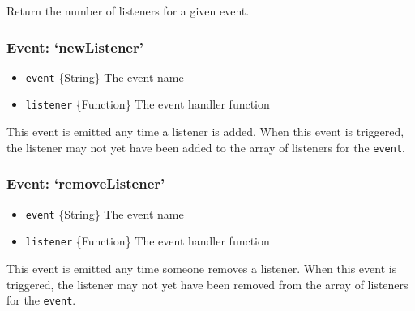 Return the number of listeners for a given event.

\subsubsection{\texorpdfstring{Event:
`newListener'}{Event: newListener}}\label{event-newlistener}

\begin{itemize}
\itemsep1pt\parskip0pt
\item
  \texttt{event} \{String\} The event name
\item
  \texttt{listener} \{Function\} The event handler function
\end{itemize}

This event is emitted any time a listener is added. When this event is
triggered, the listener may not yet have been added to the array of
listeners for the \texttt{event}.

\subsubsection{\texorpdfstring{Event:
`removeListener'}{Event: removeListener}}\label{event-removelistener}

\begin{itemize}
\itemsep1pt\parskip0pt
\item
  \texttt{event} \{String\} The event name
\item
  \texttt{listener} \{Function\} The event handler function
\end{itemize}

This event is emitted any time someone removes a listener. When this
event is triggered, the listener may not yet have been removed from the
array of listeners for the \texttt{event}.
